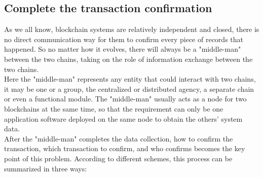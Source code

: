 %    


\subsection{Complete the transaction confirmation}
\noindent As we all know, blockchain systems are relatively independent and closed, there is no direct communication way for them to confirm every piece of records that happened. So no matter how it evolves, there will always be a "middle-man" between the two chains, taking on the role of information exchange between the two chains.\\

\noindent Here the "middle-man" represents any entity that could interact with two chains, it may be one or a group, the centralized or distributed agency, a separate chain or even a functional module. The "middle-man" usually acts as a node for two blockchains at the same time, so that the requirement can only be one application software deployed on the same node to obtain the others' system data.\\

\noindent After the "middle-man" completes the data collection, how to confirm the transaction, which transaction to confirm, and who confirms becomes the key point of this problem. According to different schemes, this process can be summarized in three ways:

